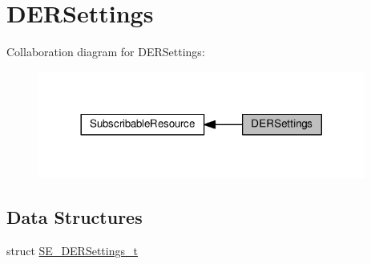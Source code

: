 \hypertarget{group__DERSettings}{}\section{D\+E\+R\+Settings}
\label{group__DERSettings}
Collaboration diagram for D\+E\+R\+Settings\+:\nopagebreak
\begin{figure}[H]
\begin{center}
\leavevmode
\includegraphics[width=305pt]{group__DERSettings}
\end{center}
\end{figure}
\subsection*{Data Structures}
\begin{DoxyCompactItemize}
\item 
struct \hyperlink{structSE__DERSettings__t}{S\+E\+\_\+\+D\+E\+R\+Settings\+\_\+t}
\end{DoxyCompactItemize}
